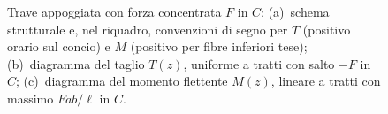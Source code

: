 \begin{figure}[htbp]
{
			}
			\caption{Trave appoggiata con forza concentrata $F$ in $C$:
				(a)~schema strutturale e, nel riquadro, convenzioni di segno
				per $T$ (positivo orario sul concio) e $M$ (positivo per
				fibre inferiori tese);
				(b)~diagramma del taglio $T(z)$, uniforme a tratti con salto
				$-F$ in $C$;
				(c)~diagramma del momento flettente $M(z)$, lineare a tratti
				con massimo $Fab/\ell$ in $C$.}
			\label{fig:stat_trasv_iso_00}
		\end{figure}
